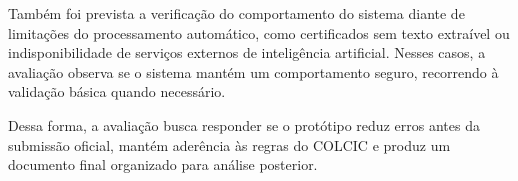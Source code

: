
Também foi prevista a verificação do comportamento do sistema diante de limitações do processamento automático, como certificados sem texto extraível ou indisponibilidade de serviços externos de inteligência artificial. Nesses casos, a avaliação observa se o sistema mantém um comportamento seguro, recorrendo à validação básica quando necessário.

Dessa forma, a avaliação busca responder se o protótipo reduz erros antes da submissão oficial, mantém aderência às regras do COLCIC e produz um documento final organizado para análise posterior.
